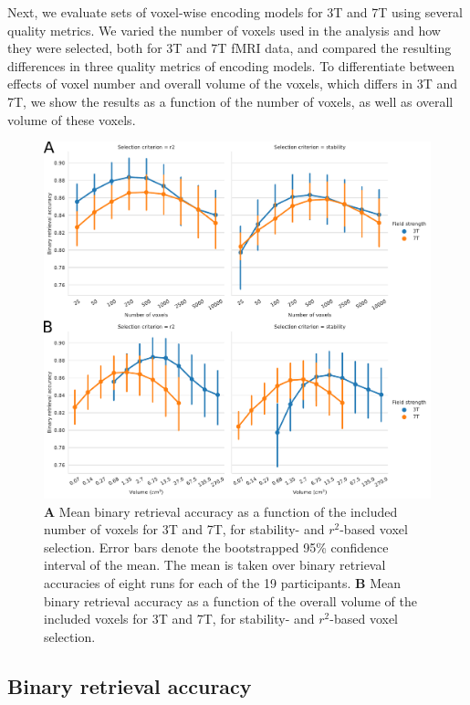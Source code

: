 Next, we evaluate sets of voxel-wise encoding models for 3T and 7T using several
quality metrics.
We varied the number of voxels used in the analysis and how they were selected,
both for 3T and 7T f{MRI} data, and compared the resulting differences in
three quality metrics of encoding models.
To differentiate between effects of voxel number and overall volume of the voxels,
which differs in 3T and 7T, we show the results as a function of the number of voxels,
as well as overall volume of these voxels.

\begin{figure}
  \centering
  \includegraphics[width=\linewidth]{pics/binary.pdf}
	
  \caption{\textbf{A} Mean binary retrieval accuracy as a function of the
  included number of voxels for 3T and 7T, for stability- and $r^2$-based
  voxel selection. Error bars denote the bootstrapped 95\% confidence interval
  of the mean. The mean is taken over binary retrieval accuracies of eight runs
  for each of the 19 participants. \textbf{B} Mean binary retrieval accuracy as
a function of the overall volume of the included voxels for 3T and 7T, for
stability- and $r^2$-based voxel selection.
}

 \label{fig:binary_retrieval}\end{figure}

\subsection*{Binary retrieval accuracy}

